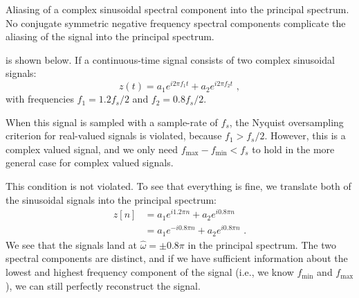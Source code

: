 \begin{marginfigure}
\begin{center}
\end{center}
\caption{Aliasing of a complex sinusoidal spectral component into the principal spectrum. No conjugate symmetric negative frequency spectral components complicate the aliasing of the signal into the principal spectrum.}
\label{fig:complex_aliasing}
\end{marginfigure}

 is shown below. If a continuous-time signal consists of two complex sinusoidal signals:
\begin{equation}
z(t)=a_1 e^{i 2\pi f_1 t} + a_2 e^{i 2\pi f_2 t}\,\,,
\end{equation}
with frequencies $f_1= 1.2 f_s/2$ and $f_2=0.8 f_s/2$.

When this signal is sampled with a sample-rate of $f_s$, the Nyquist oversampling criterion for real-valued signals is violated, because $f_1 > f_s/2$. However, this is a complex valued signal, and we only need $f_{\mathrm{max}} - f_{\mathrm{min}} < f_s$ to hold in the more general case for complex valued signals.

This condition is not violated. To see that everything is fine, we
translate both of the sinusoidal signals into the principal spectrum:
\begin{align}
z[n] &= a_1 e^{i 1.2\pi n }+ a_2 e^{i 0.8\pi n }\\
     &= a_1 e^{-i 0.8\pi n }+ a_2 e^{i 0.8\pi n }\,\,. 
\end{align}
We see that the signals land at $\hat{\omega} = \pm 0.8\pi$ in the
principal spectrum. The two spectral components are distinct, and if we have sufficient information about the lowest and highest frequency component of the signal (i.e., we know $f_{\mathrm{min}}$ and $f_{\mathrm{max}}$), we can still perfectly reconstruct the signal.

